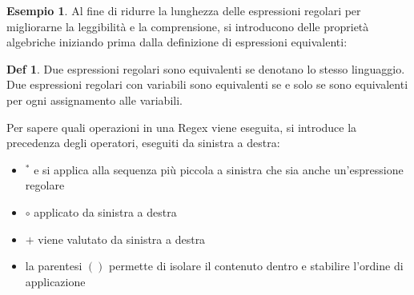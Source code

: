 \documentclass[a4paper]{book}
\theoremstyle{definition}%
\newtheorem*{defi}{Def}%
\newtheorem*{esempio}{Esempio}
\begin{document}
\begin{esempio}
Al fine di ridurre la lunghezza delle espressioni regolari per migliorarne la leggibilità e la comprensione, si introducono
delle proprietà algebriche iniziando prima dalla definizione di espressioni equivalenti:
\begin{defi}
  Due espressioni regolari sono equivalenti se denotano lo stesso linguaggio.
  Due espressioni regolari con variabili sono equivalenti se e solo se sono equivalenti per ogni assignamento alle variabili.
\end{defi}
Per sapere quali operazioni in una Regex viene eseguita, si introduce la precedenza degli operatori, eseguiti da sinistra a destra:
\begin{itemize}
  \item $^*$ e si applica alla sequenza più piccola a sinistra che sia anche un'espressione regolare
  \item $\circ$  applicato da sinistra a destra
  \item $+$  viene valutato da sinistra a destra
  \item la parentesi $( )$ permette di isolare il contenuto dentro e stabilire l'ordine di applicazione
\end{itemize}


\end{esempio}
\end{document}
